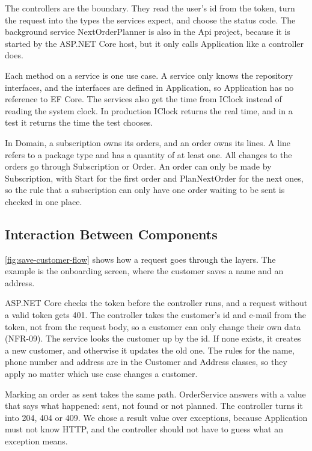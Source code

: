 The controllers are the boundary. They read the user's id from the token, turn the
request into the types the services expect, and choose the status code. The background
service NextOrderPlanner is also in the Api project, because it is started by the
ASP.NET Core host, but it only calls Application like a controller does.

Each method on a service is one use case. A service only knows the repository
interfaces, and the interfaces are defined in Application, so Application has no
reference to EF Core. The services also get the time from IClock instead of reading the
system clock. In production IClock returns the real time, and in a test it returns the
time the test chooses.

In Domain, a subscription owns its orders, and an order owns its lines. A line refers to
a package type and has a quantity of at least one. All changes to the orders go through
Subscription or Order. An order can only be made by Subscription, with Start for the first order and
PlanNextOrder for the next ones, so
the rule that a subscription can only have one order waiting to be sent is checked in
one place.

\subsection{Interaction Between Components}

\autoref{fig:save-customer-flow} shows how a request goes through the layers. The
example is the onboarding screen, where the customer saves a name and an address.


ASP.NET Core checks the token before the controller runs, and a request without a
valid token gets 401. The controller takes the customer's id and e-mail from the token,
not from the request body, so a customer can only change their own data (NFR-09). The
service looks the customer up by the id. If none exists, it creates a new customer, and
otherwise it updates the old one. The rules for the name, phone number and address are
in the Customer and Address classes, so they apply no matter which use case changes a
customer.

Marking an order as sent takes the same path. OrderService answers with a value that
says what happened: sent, not found or not planned. The controller turns it into 204,
404 or 409. We chose a result value over exceptions, because Application must not know
HTTP, and the controller should not have to guess what an exception means.

